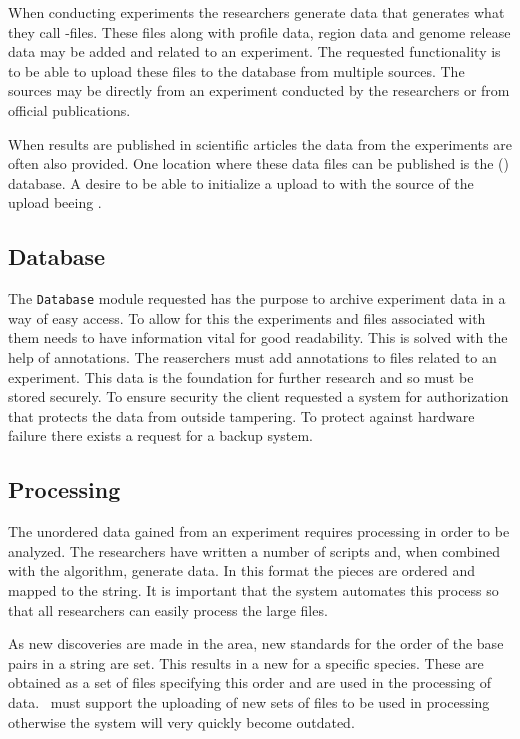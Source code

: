 When conducting experiments the researchers generate  data that generates what they call -files. These files along with profile data, region data and genome release data may be added and related to an experiment. The requested functionality is to be able to upload these files to the database from multiple sources. The sources may be directly from an experiment conducted by the researchers or from official publications.

When results are published in scientific articles the  data from the experiments are often also provided. One location where these  data files can be published is the  () database. A desire to be able to initialize a upload to \appName with the source of the upload beeing  .


\subsection{Database}
The \texttt{Database} module requested has the purpose to archive experiment data in a way of easy access. To allow for this the experiments and files associated with them needs to have information vital for good readability. This is solved with the help of annotations. The reaserchers must add annotations to files related to an experiment.
This data is the foundation for further research and so must be stored securely. To ensure security the client requested a system for authorization that protects the data from outside tampering. To protect against hardware failure there exists a request for a backup system.

\subsection{Processing}
The unordered  data gained from an experiment requires processing in order to be analyzed. The researchers have written a number of scripts and, when combined with the  algorithm, generate  data. In this format the  pieces are ordered and mapped to the  string. It is important that the system automates this process so that all researchers can easily process the large  files.

As new discoveries are made in the area, new standards for the order of the base pairs in a  string are set. This results in a new  for a specific species. These are obtained as a set of files specifying this order and are used in the processing of  data. \appName\ must support the uploading of new sets of  files to be used in processing otherwise the system will very quickly become outdated. 

